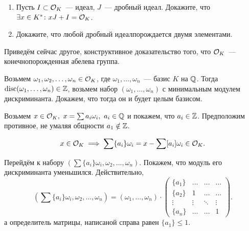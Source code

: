 \begin{definition}
\begin{homework}
\begin{enumerate}
				\item Пусть $I \subset \mathcal{O}_{K}$~--- идеал, $J$~--- дробный идеал. Докажите, что $\exists x \in K^{*}\colon x J + I = \mathcal{O}_{K}$.

				\item Докажите, что любой дробный идеалпорождается двумя элементами. 
			\end{enumerate}

			Приведём сейчас другое, конструктивное доказательство того, что $\mathcal{O}_{K}$~--- конечнопорожденная абелева группа. 

			Возьмем $\omega_{1}, \omega_{2}, \ldots, \omega_{n} \in \mathcal{O}_{K}$, где $\omega_{1}, \ldots, \omega_{n}$~--- базис $K$ на $\mathbb{Q}$.
			Тогда $\operatorname{disc}(\omega_{1}, \ldots, \omega_{n}) \in \mathbb{Z}$, возьмем набор $(\omega_1, \ldots, \omega_n)$ с минимальным модулем дискриминанта. Докажем, что тогда он и будет целым базисом. 

			Возьмем $x \in \mathcal{O}_{K}, \ x = \sum a_i \omega_i, \ a_i \in \mathbb{Q}$ и покажем, что $a_i \in \mathbb{Z}$. Предположим противное, не умаляя общности $a_{1} \notin \mathbb{Z}$. 


			\[
				x \in \mathcal{O}_{K} \implies \sum \{ a_i \}\omega_{i} = x - \sum [a_i] \omega_i \in \mathcal{O}_{K}.
			\]

			Перейдём к набору $(\sum \{ a_i \}\omega_{i}, \omega_{2}, \ldots, \omega_{n})$. Покажем, что модуль его дискриминанта уменьшился. Действительно, 
			\[
				(\sum \{ a_i \}\omega_{i}, \omega_{2}, \ldots, \omega_{n}) = (\omega_{1}, \ldots, \omega_{n}) \cdot \begin{pmatrix} \{ a_{1}\} & \ldots & \ldots & \ldots \\ \{ a_{2}\} & 1 & \ldots & \ldots \\ \vdots & \vdots & \ddots & \vdots \\ \{ a_n\} & \ldots & \ldots & 1 \end{pmatrix}.
			\]
			а определитель матрицы, написаной справа равен $\{ a_1 \} \le 1$.
		\end{homework}
	\end{definition}